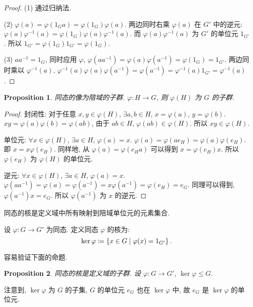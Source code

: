 \documentclass[UTF8]{ctexart}
\theoremstyle{mystyle}
\newtheorem{proposition}{Proposition}[section]
\theoremstyle{myremark}
\theoremstyle{plain}
\DeclarePairedDelimiter\set{\{}{\}}
\begin{document}
\begin{proof}
    (1) 通过归纳法.

    (2) $ \varphi(a) = \varphi(1_G a) = \varphi(1_G) \varphi(a) $. 两边同时右乘 $ \varphi(a) $ 在 $ G' $ 中的逆元: $ \varphi(a) \varphi^{-1}(a) = \varphi(1_G) \varphi(a) \varphi^{-1}(a) $. 而 $ \varphi(a) \varphi^{-1}(a) $ 为 $ G' $ 的单位元 $ 1_{G'} $. 所以 $ 1_{G'} = \varphi(1_G) 1_{G'} = \varphi(1_G) $.

    (3) $ a a^{-1} = 1_G $, 同时应用 $ \varphi $, $ \varphi(a a^{-1}) = \varphi(a) \varphi(a^{-1}) = \varphi(1_G) = 1_{G'} $. 两边同时乘以 $ \varphi^{-1}(a) $, $ \varphi^{-1}(a) \varphi(a) \varphi(a^{-1}) = \varphi(a^{-1}) = \varphi^{-1}(a) 1_{G'} = \varphi^{-1} (a) $.
\end{proof}

\begin{proposition}
    同态的像为陪域的子群. $ \varphi \colon H \to G $, 则 $ \varphi(H) $ 为 $ G $ 的子群.
\end{proposition}

\begin{proof}
    封闭性: 对于任意 $ x, y \in \varphi(H) $, $ \exists a, b \in H $, $ x = \varphi(a) $, $ y = \varphi(b) $. $ x y = \varphi(a) \varphi(b) = \varphi(a b) $, 由于 $ ab \in H $, $ \varphi(a b) \in \varphi(H) $. 所以 $ x y \in \varphi(H) $.

    单位元: $ \forall x \in \varphi(H) $, $ \exists a \in H $, $ \varphi(a) = x $. $ \varphi(a) = \varphi(a e_H) = \varphi(a) \varphi(e_H) $. 即 $ x = x \varphi(e_H) $. 同样地, 从 $ \varphi(a) = \varphi(e_H a) $ 可以得到 $ x = \varphi(e_H) x $. 所以 $ \varphi(e_H) $ 为 $ \varphi(H) $ 的单位元.

    逆元: $ \forall x \in \varphi(H) $, $ \exists a \in H $, $ \varphi(a) = x $. $ \varphi(a a^{-1}) = \varphi(a) = \varphi(a^{-1}) = x \varphi(a^{-1}) = \varphi(e_H) = e_G $. 同理可以得到, $ \varphi(a^{-1}) x = e_G $. 所以 $ \varphi(a^{-1}) $ 为 $ x $ 的逆元.
\end{proof}


同态的核是定义域中所有映射到陪域单位元的元素集合.
\begin{definition}
    设 $ \varphi \colon G \to G' $ 为同态. 定义同态 $ \varphi $ 的核为: \[ \ker \varphi \coloneqq \set{x \in G \mid \varphi(x) = 1_{G'}} \,.\]
\end{definition}


容易验证下面的命题.
\begin{proposition}
    同态的核是定义域的子群. 设 $ \varphi \colon G \to G' $, $ \ker \varphi \le G $.
\end{proposition}

注意到, $ \ker \varphi $ 为 $ G $ 的子集, $ G $ 的单位元 $ e_G $ 也在 $ \ker \varphi $ 中, 故 $ e_G $ 是 $ \ker \varphi $ 的单位元.
\end{document}
